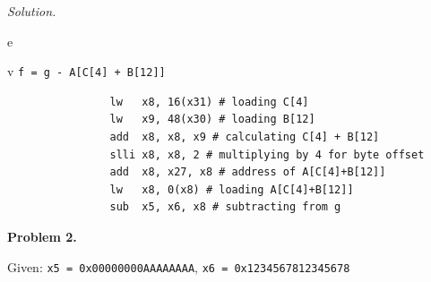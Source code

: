 \documentclass[11pt]{article}
\newcommand{\problem}[1]{\vspace{0.5em}\noindent\textbf{Problem #1.}\vspace{0.3em}}
\newenvironment{solution}{\par\noindent\textit{Solution.}}{\par\vspace{1em}}
\begin{document}
\begin{solution}
\begin{subproblem}{e}
        \begin{subproblem}{v}
            \texttt{f = g - A[C[4] + B[12]]}
            \begin{verbatim}
                lw   x8, 16(x31) # loading C[4]
                lw   x9, 48(x30) # loading B[12]
                add  x8, x8, x9 # calculating C[4] + B[12]
                slli x8, x8, 2 # multiplying by 4 for byte offset
                add  x8, x27, x8 # address of A[C[4]+B[12]]
                lw   x8, 0(x8) # loading A[C[4]+B[12]]
                sub  x5, x6, x8 # subtracting from g
            \end{verbatim}
        \end{subproblem}

    \end{subproblem}
\end{solution}

\problem{2}

Given: \texttt{x5 = 0x00000000AAAAAAAA}, \texttt{x6 = 0x1234567812345678}
\end{document}
